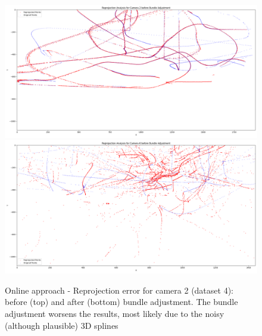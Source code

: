 \documentclass[11pt]{article}
\begin{document}
\begin{figure}[h]
    \centering
    \includegraphics[width=\textwidth]{imgs/online_no_ba_cam2.png}
    \includegraphics[width=\textwidth]{imgs/online_ba_cam2.png}
    \caption{Online approach - Reprojection error for camera 2 (dataset 4): before (top) and after (bottom) bundle adjustment. The bundle adjustment worsens the results, most likely due to the noisy (although plausible) 3D splines}
    \label{fig:bad_ba_online}
\end{figure}
\end{document}
